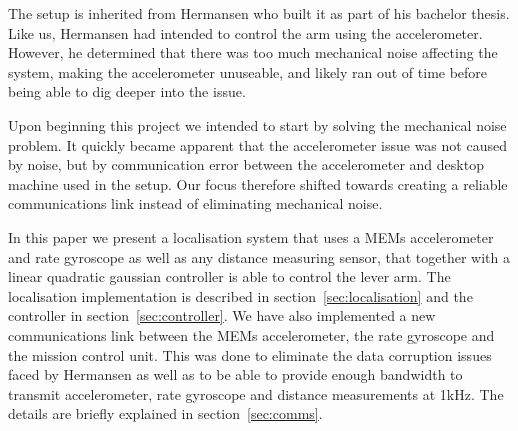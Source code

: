 The setup is inherited from Hermansen who built it as part of his bachelor thesis\cite{Hermansen2013a}.
Like us, Hermansen had intended to control the arm using the accelerometer. However, he determined that there was too much mechanical 
noise affecting the system, making the accelerometer unuseable, and likely ran out of time before being able to dig deeper into the 
issue.

Upon beginning this project we intended to start by solving the mechanical noise problem. It quickly became apparent that the 
accelerometer issue was not caused by noise, but by communication error between the accelerometer and desktop machine used in the setup.
Our focus therefore shifted towards creating a reliable communications link instead of eliminating mechanical noise.

In this paper we present a localisation system that uses a MEMs accelerometer and rate gyroscope as well as any distance measuring sensor,
that together with a linear quadratic gaussian controller is able to control the lever arm. The localisation implementation is described
in section~\ref{sec:localisation} and the controller in section~\ref{sec:controller}.
We have also implemented a new communications 
link between the MEMs accelerometer, the rate gyroscope and the mission control unit. This was done to eliminate the data corruption 
issues faced by Hermansen as well as to be able to provide enough bandwidth to transmit accelerometer, rate gyroscope and distance 
measurements at 1kHz. The details are briefly explained in section~\ref{sec:comms}. 


